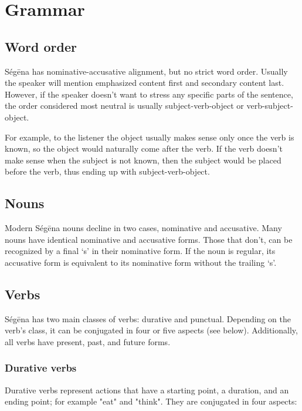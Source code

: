 \chapter{Grammar}

\section{Word order}

Ségēna has nominative-accusative alignment, but no strict word order. Usually
the speaker will mention emphasized content first and secondary content last.
However, if the speaker doesn't want to stress any specific parts of the
sentence, the order considered most neutral is usually subject-verb-object or
verb-subject-object.

For example, to the listener the object usually makes sense only once the verb
is known, so the object would naturally come after the verb. If the verb doesn't
make sense when the subject is not known, then the subject would be placed
before the verb, thus ending up with subject-verb-object.

\section{Nouns}

Modern Ségēna nouns decline in two cases, nominative and accusative. Many nouns
have identical nominative and accusative forms. Those that don't, can be
recognized by a final ‘s’ in their nominative form. If the noun is regular, its
accusative form is equivalent to its nominative form without the trailing ‘s’.

\section{Verbs}

Ségēna has two main classes of verbs: durative and punctual. Depending on the
verb's class, it can be conjugated in four or five aspects (see below).
Additionally, all verbs have present, past, and future forms.

\subsection{Durative verbs}

Durative verbs represent actions that have a starting point, a duration, and an
ending point; for example "eat" and "think". They are conjugated in four
aspects:

